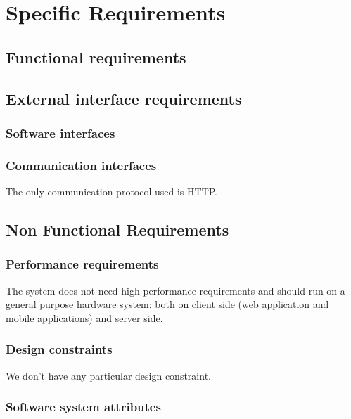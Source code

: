 \chapter{Specific Requirements}
\section{Functional requirements}


\section{External interface requirements}

\subsection{Software interfaces}

\subsection{Communication interfaces}
The only communication protocol used is HTTP.


\section{Non Functional Requirements}
\subsection{Performance requirements}
The system does not need high performance requirements and should run on a general purpose hardware system: both on client side (web application and mobile applications) and server side.
\subsection{Design constraints}
We don't have any particular design constraint.
\subsection{Software system attributes}